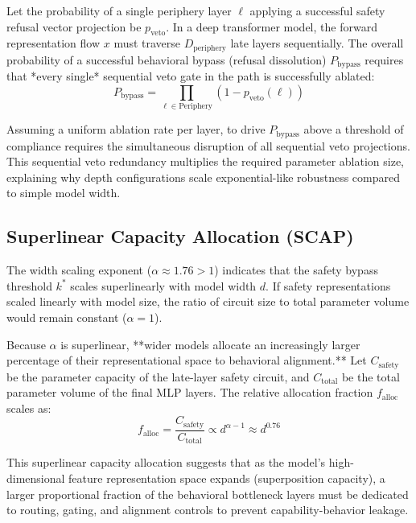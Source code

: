 \documentclass[11pt]{article}
\begin{document}
Let the probability of a single periphery layer $\ell$ applying a successful safety refusal vector projection be $p_{\text{veto}}$. In a deep transformer model, the forward representation flow $x$ must traverse $D_{\text{periphery}}$ late layers sequentially. The overall probability of a successful behavioral bypass (refusal dissolution) $P_{\text{bypass}}$ requires that *every single* sequential veto gate in the path is successfully ablated:
\begin{equation}
P_{\text{bypass}} = \prod_{\ell \in \text{Periphery}} (1 - p_{\text{veto}}(\ell))
\end{equation}

Assuming a uniform ablation rate per layer, to drive $P_{\text{bypass}}$ above a threshold of compliance requires the simultaneous disruption of all sequential veto projections. This sequential veto redundancy multiplies the required parameter ablation size, explaining why depth configurations scale exponential-like robustness compared to simple model width.

\subsection{Superlinear Capacity Allocation (SCAP)}

The width scaling exponent ($\alpha \approx 1.76 > 1$) indicates that the safety bypass threshold $k^*$ scales superlinearly with model width $d$. If safety representations scaled linearly with model size, the ratio of circuit size to total parameter volume would remain constant ($\alpha = 1$). 

Because $\alpha$ is superlinear, **wider models allocate an increasingly larger percentage of their representational space to behavioral alignment.** Let $C_{\text{safety}}$ be the parameter capacity of the late-layer safety circuit, and $C_{\text{total}}$ be the total parameter volume of the final MLP layers. The relative allocation fraction $f_{\text{alloc}}$ scales as:
\begin{equation}
f_{\text{alloc}} = \frac{C_{\text{safety}}}{C_{\text{total}}} \propto d^{\alpha - 1} \approx d^{0.76}
\end{equation}

This superlinear capacity allocation suggests that as the model's high-dimensional feature representation space expands (superposition capacity), a larger proportional fraction of the behavioral bottleneck layers must be dedicated to routing, gating, and alignment controls to prevent capability-behavior leakage.
\end{document}

